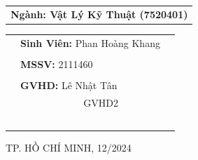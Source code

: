 \documentclass[13pt,a4paper,font=cm]{report}
\theoremstyle{definition}
\begin{document}
\begin{titlepage}
\begin{center}
\begin{tabular}{c}
\\ \vspace{0.5cm} {\textbf{{\LARGE Ngành: Vật Lý Kỹ Thuật (7520401)}}}
\end{tabular}
\end{center}
\begin{table}[h]
\begin{tabular}{rll}
\hspace{6 cm} &  \textbf{\Large Sinh Viên:} {\Large Phan Hoàng Khang}
\\
\\
\hspace{6 cm} &   \textbf{\Large MSSV:} {\Large 2111460 }
\\
\\
\hspace{6 cm}  & \textbf{\Large GVHD:} {\Large Lê Nhật Tân }\\
\hspace{8 cm}  & {$\;\;\;\;\;\;\;\;\;\;\;\;\;\;\;\;\;\;\;\;\;\;$ \Large GVHD2 } %
\\
\\
\\
\\
\\
\\
\end{tabular}
\end{table}
\vspace{0.5cm}
\begin{center}
{\Large TP. HỒ CHÍ MINH, 12/2024 }
\end{center}
\end{titlepage}
\thispagestyle{empty}
\renewcommand{\listalgorithmname}{Danh sách mã giả}
\newpage
\end{document}
